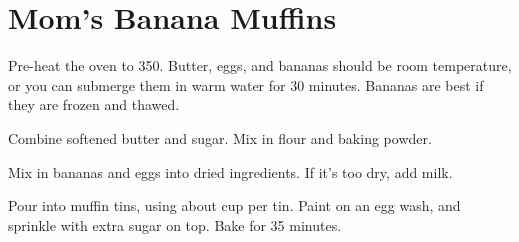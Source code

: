 \section{Mom's Banana Muffins}
\begin{recipe}


Pre-heat the oven to 350\degree{}. 
Butter, eggs, and bananas should be room temperature, or you
can submerge them in warm water for 30 minutes. 
Bananas are best if they are frozen and thawed. 


Combine softened butter and sugar. Mix in flour and baking powder. 


Mix in bananas and eggs into dried ingredients. If it's 
too dry, add milk. 

Pour into muffin tins, using about  cup per tin. 
Paint on an egg wash, and sprinkle with extra sugar on top. 
Bake for 35 minutes. 

\end{recipe}
